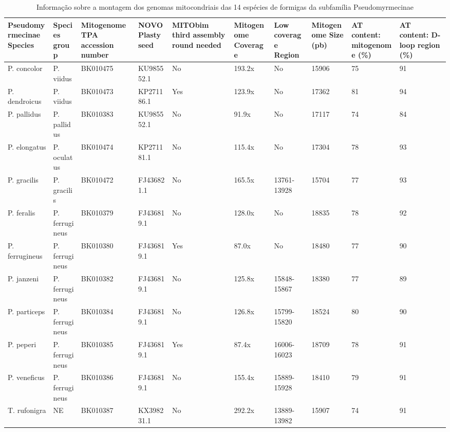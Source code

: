 \documentclass[../DISSERTACAO_MAIN.tex]{subfiles}
\begin{document}
\begin{landscape}
	\begin{table}
	\caption[Dados da montagem de mitogenomas]{Informação sobre a montagem dos genomas mitocondriais das 14 espécies de formigas da subfamília Pseudomyrmecinae}
	{\small
	\begin{tabularx}{\linewidth}{| p{3cm} | X | X | X | X | X | X | p{2cm} | p{2cm} | p{2cm} | }
		\hline

		Pseu\-do\-myr\-me\-ci\-nae Species & Species group & Mitogenome TPA accession number & NOVOPlasty seed & MITObim third assembly round needed & Mitogenome Coverage & Low coverage Region & Mitogenome Size (pb) & AT content: mitogenome (\%) & AT content: D-loop region (\%) \\ \hline

		P. concolor & P. viidus & BK010475 & KU985552.1 & No & 193.2x & No & 15906 & 75 & 91 \\ \hline

		P. dendroicus & P. viidus & BK010473 & KP271186.1 & Yes & 123.9x & No & 17362 & 81 & 94 \\ \hline

		P. pallidus & P. pallidus & BK010383 & KU985552.1 & No & 91.9x & No & 17117 & 74 & 84 \\ \hline

		P. elongatus & P. oculatus & BK010474 & KP271181.1 & No & 115.4x & No & 17304 & 78 & 93 \\ \hline

		P. gracilis & P. gracilis & BK010472 & FJ436821.1 & No & 165.5x & 13761-13928 & 15704 & 77 & 93 \\ \hline

		P. feralis & P. ferrugineus & BK010379 & FJ436819.1 & No & 128.0x & No & 18835 & 78 & 92 \\ \hline

		P. ferrugineus & P. ferrugineus & BK010380 & FJ436819.1 & Yes & 87.0x & No & 18480 & 77 & 90 \\ \hline
		P. janzeni & P. ferrugineus & BK010382 & FJ436819.1 & No & 125.8x & 15848-15867 & 18380 & 77 & 89 \\ \hline

		P. particeps & P. ferrugineus & BK010384 & FJ436819.1 & No & 126.8x & 15799-15820 & 18524 & 80 & 90 \\ \hline

		P. peperi & P. ferrugineus & BK010385 & FJ436819.1 & Yes & 87.4x & 16006-16023 & 18709 & 78 & 91 \\ \hline

		P. veneficus & P. ferrugineus & BK010386 & FJ436819.1 & No & 155.4x & 15889-15928 & 18410 & 79 & 91 \\ \hline
		T. rufonigra & NE & BK010387 & KX398231.1 & No & 292.2x & 13889-13982 & 15907 & 74 & 91 \\ \hline

	\end{tabularx}}
	\label{tab:montagem}
	\end{table}
	
\end{landscape}
\end{document}
